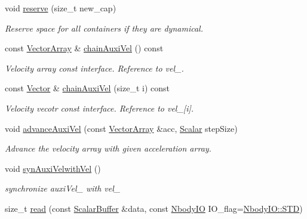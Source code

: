 \begin{DoxyCompactItemize}
void \mbox{\hyperlink{class_space_h_1_1_vel_dep_chain_particles_a0257a89d0e3058624cc076c2956b94ea}{reserve}} (size\+\_\+t new\+\_\+cap)
\begin{DoxyCompactList}\small\item\em Reserve space for all containers if they are dynamical. \end{DoxyCompactList}\item 
const \mbox{\hyperlink{class_space_h_1_1_vel_indep_particles_aa9983058940249df8b00fa800e8cbad2}{Vector\+Array}} \& \mbox{\hyperlink{class_space_h_1_1_vel_dep_chain_particles_ab2ec7493ee6cb12ed77f6aac4f4e8660}{chain\+Auxi\+Vel}} () const
\begin{DoxyCompactList}\small\item\em Velocity array const interface. Reference to vel\+\_\+. \end{DoxyCompactList}\item 
const \mbox{\hyperlink{class_space_h_1_1_vel_indep_particles_a61bbcfdb0dc7f99f3c68af69a755c935}{Vector}} \& \mbox{\hyperlink{class_space_h_1_1_vel_dep_chain_particles_a1f717dd8619e3237362bacd55623500c}{chain\+Auxi\+Vel}} (size\+\_\+t i) const
\begin{DoxyCompactList}\small\item\em Velocity vecotr const interface. Reference to vel\+\_\+\mbox{[}i\mbox{]}. \end{DoxyCompactList}\item 
void \mbox{\hyperlink{class_space_h_1_1_vel_dep_chain_particles_a7dae0ccc9035be9e37e45d45b030a89c}{advance\+Auxi\+Vel}} (const \mbox{\hyperlink{class_space_h_1_1_vel_indep_particles_aa9983058940249df8b00fa800e8cbad2}{Vector\+Array}} \&acc, \mbox{\hyperlink{class_space_h_1_1_vel_indep_particles_aeb47d8131b30ed790320ff634f0d6af1}{Scalar}} step\+Size)
\begin{DoxyCompactList}\small\item\em Advance the velocity array with given acceleration array. \end{DoxyCompactList}\item 
void \mbox{\hyperlink{class_space_h_1_1_vel_dep_chain_particles_a0d32d36439671d1c2344178d1d548567}{syn\+Auxi\+Velwith\+Vel}} ()
\begin{DoxyCompactList}\small\item\em synchronize auxi\+Vel\+\_\+ with vel\+\_\+ \end{DoxyCompactList}\item 
size\+\_\+t \mbox{\hyperlink{class_space_h_1_1_vel_dep_chain_particles_a901445956f76ea38574b2df3c45c77a1}{read}} (const \mbox{\hyperlink{class_space_h_1_1_vel_indep_particles_abca40159a816385790d5a6fd19c1dc6d}{Scalar\+Buffer}} \&data, const \mbox{\hyperlink{namespace_space_h_a296a8bae763a754564bfdce216e31b59}{Nbody\+IO}} I\+O\+\_\+flag=\mbox{\hyperlink{namespace_space_h_a296a8bae763a754564bfdce216e31b59ac6ce23be5d350ce18a665427d2d950f7}{Nbody\+I\+O\+::\+S\+TD}})

\end{DoxyCompactItemize}
